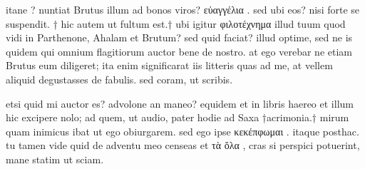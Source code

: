


 itane ? nuntiat Brutus illum ad bonos viros? εὐαγγέλια . sed ubi eos? nisi forte se suspendit. † hic autem ut fultum est.† ubi igitur φιλοτέχνημα illud tuum quod vidi in Parthenone, Ahalam et Brutum? sed quid faciat? illud optime, sed ne is quidem qui omnium flagitiorum auctor bene de nostro. at ego verebar ne etiam Brutus eum diligeret; ita enim significarat iis litteris quas ad me, at vellem aliquid degustasses de fabulis. sed coram, ut scribis.

 etsi quid mi auctor es? advolone an maneo? equidem et in libris haereo et illum hic excipere nolo; ad quem, ut audio, pater hodie ad Saxa †acrimonia.† mirum quam inimicus ibat ut ego obiurgarem. sed ego ipse κεκέπφωμαι . itaque posthac. tu tamen vide quid de adventu meo censeas et τὰ ὅλα , cras si perspici potuerint, mane statim ut sciam.
